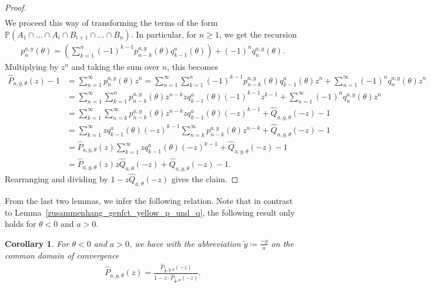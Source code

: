\documentclass[12pt]{article}
\renewcommand{\P}{\mathbb{P}} %
\newcommand{\1}{\mathds{1}}
\theoremstyle{definition}
\theoremstyle{plain}
\newtheorem{Corollary}[definition]{Corollary}
\theoremstyle{remark}
\begin{document}
\begin{proof}
\begin{align*}
        \end{align*}
        We proceed this way of transforming the terms of the form $\P(A_1\cap\dots\cap A_i\cap B_{i+1}\cap\dots\cap B_n)$. %
        In particular, for $n\geq 1$, we get the recursion
        \begin{align*}
            p_n^{a,y}(\theta)=\left(\sum_{k=1}^n(-1)^{k-1}p_{n-k}^{a,y}(\theta)q_{k-1}^a(\theta)\right)+(-1)^nq_n^{a,y}(\theta).
        \end{align*}
        Multiplying by $z^n$ and taking the sum over $n$, this becomes
        \begin{align*}
            \hat{P}_{a,y,\theta}(z)-1
            &=\sum_{n=1}^{\infty}p_n^{a,y}(\theta)z^n
            =\sum_{n=1}^{\infty}\sum_{k=1}^n(-1)^{k-1}p_{n-k}^{a,y}(\theta)q_{k-1}^a(\theta)z^n+\sum_{n=1}^{\infty}(-1)^nq_n^{a,y}(\theta)z^n
            \\&=\sum_{n=1}^{\infty}\sum_{k=1}^np_{n-k}^{a,y}(\theta)z^{n-k}zq_{k-1}^a(\theta)(-1)^{k-1}z^{k-1}+\sum_{n=1}^{\infty}(-1)^nq_n^{a,y}(\theta)z^n
            \\&=\sum_{k=1}^{\infty}\sum_{n=k}^{\infty}p_{n-k}^{a,y}(\theta)z^{n-k}zq_{k-1}^a(\theta)(-z)^{k-1}+\hat{Q}_{a,y,\theta}(-z)-1
            \\&=\sum_{k=1}^{\infty}zq_{k-1}^a(\theta)(-z)^{k-1}\sum_{n=k}^{\infty}p_{n-k}^{a,y}(\theta)z^{n-k}+\hat{Q}_{a,y,\theta}(-z)-1
            \\&=\hat{P}_{a,y,\theta}(z)\sum_{k=1}^{\infty}zq_{k-1}^a(\theta)(-z)^{k-1}+\hat{Q}_{a,y,\theta}(-z)-1
            \\&=\hat{P}_{a,y,\theta}(z)z\hat{Q}_{a,\theta}(-z)+\hat{Q}_{a,y,\theta}(-z)-1.
        \end{align*}
        Rearranging and dividing by  $1-z\hat{Q}_{a,\theta}(-z)$ gives the claim. 
    \end{proof}
From the last two lemmas, we infer the following relation. Note that in contrast to Lemma~\ref{zusammenhang_genfct_yellow_p_und_q}, the following result only holds for $\theta <0$ and $a>0$.
\begin{Corollary}
For $\theta <0$ and $a>0$, we have with the abbreviation $\tilde{y}\coloneqq\frac{-y}{a}$ on the common domain of convergence       \begin{align}\label{generatingfunction_yellow_and_green_rel}
        \hat{P}_{a,y,\theta}(z)=\frac{\hat{P}_{\frac{1}{a},\tilde{y},\theta}(-z)}{1-z\cdot\hat{P}_{\frac{1}{a},\theta}(-z)}.
    \end{align}
\end{Corollary}
\end{document}
